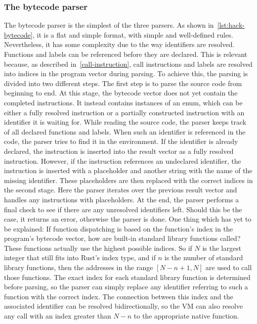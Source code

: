 \subsubsection{The bytecode parser} \label{bytecode-parser}
The bytecode parser is the simplest of the three parsers.
As shown in~\cref{lst:hack-bytecode}, it is a flat and simple format, with simple and well-defined rules.
Nevertheless, it has some complexity due to the way identifiers are resolved.
Functions and labels can be referenced before they are declared.
This is relevant because, as described in~\cref{call-instruction}, call instructions and labels are resolved into indices in the program vector during parsing.
To achieve this, the parsing is divided into two different steps.
The first step is to parse the source code from beginning to end.
At this stage, the bytecode vector does not yet contain the completed instructions.
It instead contains instances of an enum, which can be either a fully resolved instruction or a partially constructed instruction with an identifier it is waiting for.
While reading the source code, the parser keeps track of all declared functions and labels.
When such an identifier is referenced in the code, the parser tries to find it in the environment.
If the identifier is already declared, the instruction is inserted into the result vector as a fully resolved instruction.
However, if the instruction references an undeclared identifier, the instruction is inserted with a placeholder and another string with the name of the missing identifier.
These placeholders are then replaced with the correct indices in the second stage.
Here the parser iterates over the previous result vector and handles any instructions with placeholders.
At the end, the parser performs a final check to see if there are any unresolved identifiers left.
Should this be the case, it returns an error, otherwise the parser is done.
One thing which has yet to be explained: If function dispatching is based on the function's index in the program's bytecode vector, how are built-in standard library functions called?
These functions actually use the highest possible indices.
So if \(N\) is the largest integer that still fits into Rust's index type, and if \(n\) is the number of standard library functions, then the addresses in the range \([N - n + 1, N]\) are used to call those functions.
The exact index for each standard library function is determined before parsing, so the parser can simply replace any identifier referring to such a function with the correct index.
The connection between this index and the associated identifier can be resolved bidirectionally, so the VM can also resolve any call with an index greater than \(N - n\) to the appropriate native function.

